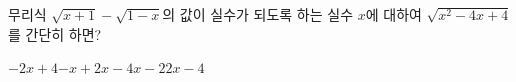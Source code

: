 \hspace*{2mm}\begin{minipage}[t]{\dimexpr\linewidth-2mm\relax}\vspace{0pt}
무리식 $\sqrt{x+1}-\sqrt{1-x}$의 값이 실수가 되도록 하는 실수 $x$에 대하여 $\sqrt{x^2-4x+4}$를 간단히 하면?
\begin{choices32}{$-2x+4$}{$-x+2$}{$x-4$}{$x-2$}{$2x-4$}\end{choices32}\end{minipage}
